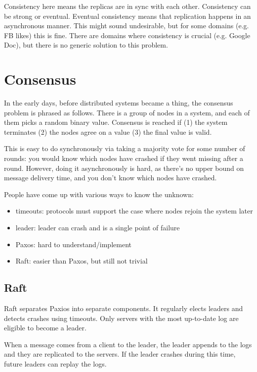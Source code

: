 \documentclass[twoside]{article}
\begin{document}
Consistency here means the replicas are in sync with each other. Consistency can be strong or eventual. Eventual consistency means that replication happens in an asynchronous manner. This might sound undesirable, but for some domains (e.g. FB likes) this is fine. There are domains where consistency is crucial (e.g. Google Doc), but there is no generic solution to this problem.

\section{Consensus}

In the early days, before distributed systems became a thing, the consensus problem is phrased as follows. There is a group of nodes in a system, and each of them picks a random binary value. Consensus is reached if (1) the system terminates (2) the nodes agree on a value (3) the final value is valid.

This is easy to do synchronously via taking a majority vote for some number of rounds: you would know which nodes have crashed if they went missing after a round. However, doing it asynchronously is hard, as there's no upper bound on message delivery time, and you don't know which nodes have crashed.

People have come up with various ways to know the unknown:

\begin{itemize}
    \item timeouts: protocols must support the case where nodes rejoin the system later
    \item leader: leader can crash and is a single point of failure
    \item Paxos: hard to understand/implement
    \item Raft: easier than Paxos, but still not trivial
\end{itemize}

\subsection{Raft}

Raft separates Paxios into separate components. It regularly elects leaders and detects crashes using timeouts. Only servers with the most up-to-date log are eligible to become a leader.

When a message comes from a client to the leader, the leader appends to the logs and they are replicated to the servers. If the leader crashes during this time, future leaders can replay the logs.
\end{document}

